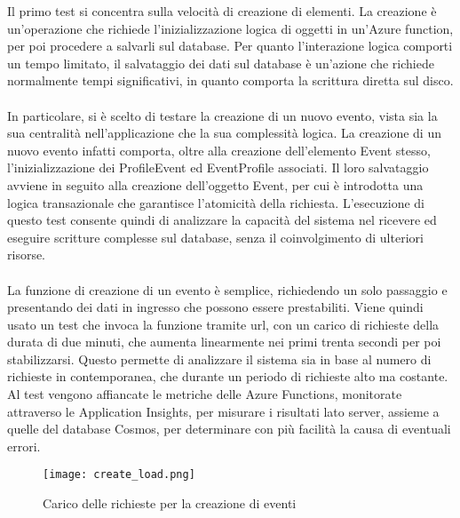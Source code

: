 Il primo test si concentra sulla velocità di creazione di elementi.
La creazione è un'operazione che richiede l'inizializzazione logica di oggetti in un'Azure function, 
per poi procedere a salvarli sul database.
Per quanto l'interazione logica comporti un tempo limitato, 
il salvataggio dei dati sul database è un'azione che richiede normalmente tempi significativi, 
in quanto comporta la scrittura diretta sul disco.\\
\\
In particolare, si è scelto di testare la creazione di un nuovo evento,
vista sia la sua centralità nell'applicazione che la sua complessità logica.
La creazione di un nuovo evento infatti comporta, 
oltre alla creazione dell'elemento Event stesso,
l'inizializzazione dei ProfileEvent ed EventProfile associati.
Il loro salvataggio avviene in seguito alla creazione dell'oggetto Event,
per cui è introdotta una logica transazionale che garantisce l'atomicità della richiesta.
L'esecuzione di questo test consente quindi di analizzare la capacità del sistema 
nel ricevere ed eseguire scritture complesse sul database, 
senza il coinvolgimento di ulteriori risorse.\\
\\
La funzione di creazione di un evento è semplice,
richiedendo un solo passaggio e presentando dei dati in ingresso che possono essere prestabiliti.
Viene quindi usato un test che invoca la funzione tramite url,
con un carico di richieste della durata di due minuti, 
che aumenta linearmente nei primi trenta secondi per poi stabilizzarsi.
Questo permette di analizzare il sistema sia in base al numero di richieste in contemporanea,
che durante un periodo di richieste alto ma costante.
Al test vengono affiancate le metriche delle Azure Functions, 
monitorate attraverso le Application Insights,
per misurare i risultati lato server,
assieme a quelle del database Cosmos, 
per determinare con più facilità la causa di eventuali errori.\\
\begin{figure}[htbp]
    \begin{center}
        \texttt{[image: create\_load.png]}
        \caption{Carico delle richieste per la creazione di eventi}
    \end{center}
\end{figure}\\

